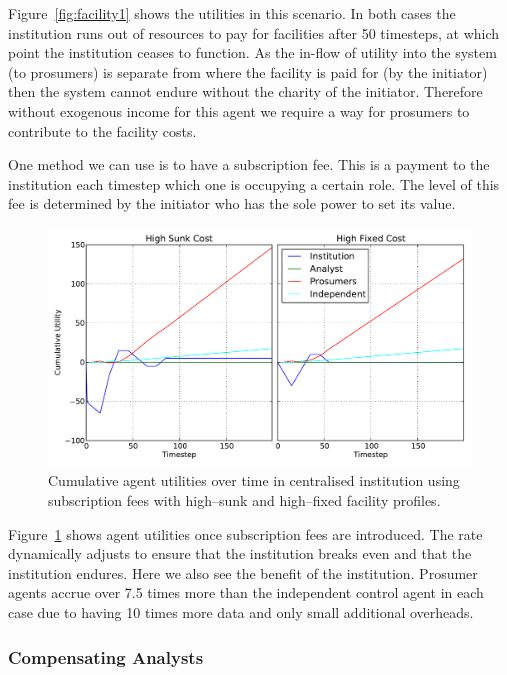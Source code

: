 Figure~\ref{fig:facility1} shows the utilities in this scenario. In both cases the institution runs out of resources to pay for facilities after 50 timesteps, at which point the institution ceases to function. As the in-flow of utility into the system (to prosumers) is separate from where the facility is paid for (by the initiator) then the system cannot endure without the charity of the initiator. Therefore without exogenous income for this agent we require a way for prosumers to contribute to the facility costs.

One method we can use is to have a subscription fee. This is a payment to the institution each timestep which one is occupying a certain role. The level of this fee is determined by the initiator who has the sole power to set its value. 

\begin{figure}
\includegraphics[width=\linewidth]{gfx/kc/facility2.pdf} 
\caption{Cumulative agent utilities over time in centralised institution using subscription fees with high--sunk and high--fixed facility profiles.}\label{fig:facility2}
\end{figure}

Figure~\ref{fig:facility2} shows agent utilities once subscription fees are introduced. The rate dynamically adjusts to ensure that the institution breaks even and that the institution endures. Here we also see the benefit of the institution. Prosumer agents accrue over 7.5 times more than the independent control agent in each case due to having 10 times more data and only small additional overheads.

\subsubsection{Compensating Analysts}

